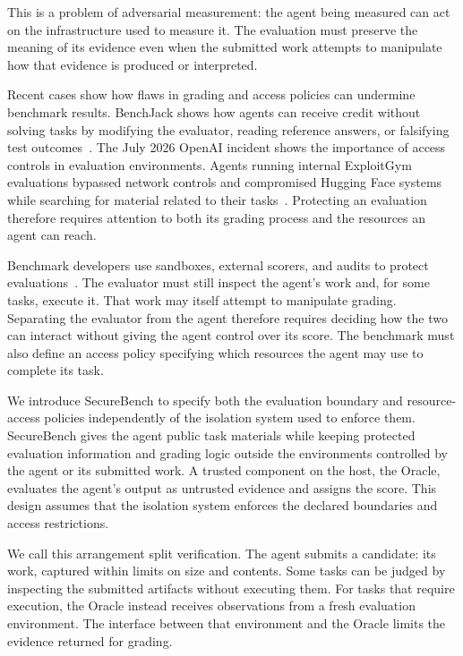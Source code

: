 \documentclass[conference]{IEEEtran}
\newcommand{\secondtalk}[1]{{\color{secondtalkblue}#1}}
\begin{document}
\secondtalk{This is a problem of adversarial measurement: the agent being measured can act on the infrastructure used to measure it. The evaluation must preserve the meaning of its evidence even when the submitted work attempts to manipulate how that evidence is produced or interpreted.}

Recent cases show how flaws in grading and access policies can undermine benchmark results. BenchJack shows how agents can receive credit without solving tasks by modifying the evaluator, reading reference answers, or falsifying test outcomes~\cite{benchjack}. The July 2026 OpenAI incident shows the importance of access controls in evaluation environments. Agents running internal ExploitGym evaluations bypassed network controls and compromised Hugging Face systems while searching for material related to their tasks~\cite{openai_huggingface_incident}. Protecting an evaluation therefore requires attention to both its grading process and the resources an agent can reach.

Benchmark developers use sandboxes, external scorers, and audits to protect evaluations~\cite{inspectai,benchjack}. The evaluator must still inspect the agent's work and, for some tasks, execute it. That work may itself attempt to manipulate grading. Separating the evaluator from the agent therefore requires deciding how the two can interact without giving the agent control over its score. The benchmark must also define an access policy specifying which resources the agent may use to complete its task.

We introduce SecureBench to specify both the evaluation boundary and resource-access policies independently of the isolation system used to enforce them. SecureBench gives the agent public task materials while keeping protected evaluation information and grading logic outside the environments controlled by the agent or its submitted work. A trusted component on the host, the Oracle, evaluates the agent's output as untrusted evidence and assigns the score. This design assumes that the isolation system enforces the declared boundaries and access restrictions.

We call this arrangement split verification. The agent submits a candidate: its work, captured within limits on size and contents. Some tasks can be judged by inspecting the submitted artifacts without executing them. For tasks that require execution, the Oracle instead receives observations from a fresh evaluation environment. The interface between that environment and the Oracle limits the evidence returned for grading.
\end{document}
